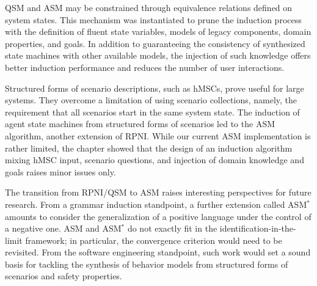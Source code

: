 QSM and ASM may be constrained through equivalence relations defined on system states. This mechanism was instantiated to prune the induction process with the definition of fluent state variables, models of legacy components, domain properties, and goals. In addition to guaranteeing the consistency of synthesized state machines with other available models, the injection of such knowledge offers better induction performance and reduces the number of user interactions.

Structured forms of scenario descriptions, such as hMSCs, prove useful for large systems. They overcome a limitation of using scenario collections, namely, the requirement that all scenarios start in the same system state. The induction of agent state machines from structured forms of scenarios led to the ASM algorithm, another extension of RPNI. While our current ASM implementation is rather limited, the chapter showed that the design of an induction algorithm mixing hMSC input, scenario questions, and injection of domain knowledge and goals raises minor issues only.

The transition from RPNI/QSM to ASM raises interesting perspectives for future research. From a grammar induction standpoint, a further extension called ASM$^*$ amounts to consider the generalization of a positive language under the control of a negative one. ASM and ASM$^*$ do not exactly fit in the identification-in-the-limit framework; in particular, the convergence criterion would need to be revisited. From the software engineering standpoint, such work would set a sound basis for tackling the synthesis of behavior models from structured forms of scenarios and safety properties.
